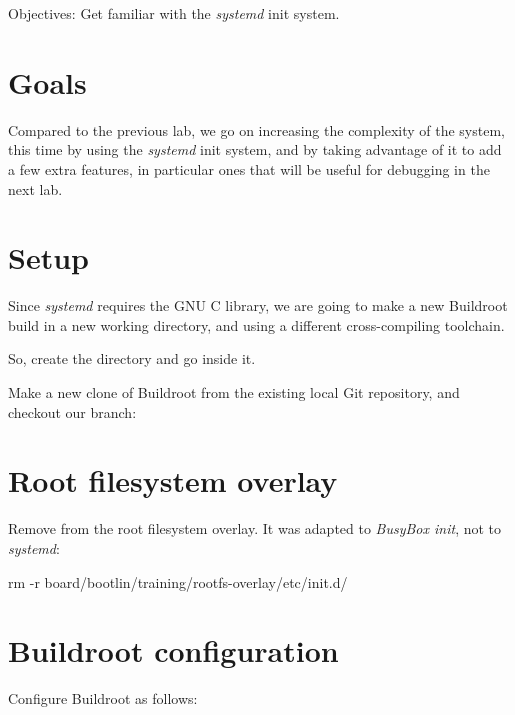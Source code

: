   {Objectives: Get familiar with the {\em systemd} init system.}

\section{Goals}

Compared to the previous lab, we go on increasing the complexity
of the system, this time by using the {\em systemd} init system,
and by taking advantage of it to add a few extra features, in particular
ones that will be useful for debugging in the next lab.

\section{Setup}

Since {\em systemd} requires the GNU C library, we are going
to make a new Buildroot build in a new working directory, and
using a different cross-compiling toolchain.

So, create the  directory
and go inside it.

Make a new clone of Buildroot from the existing local Git repository,
and checkout our  branch:


\section{Root filesystem overlay}

Remove  from the root filesystem overlay.
It was adapted to {\em BusyBox init}, not to {\em systemd}:

\begin{bashinput}
rm -r board/bootlin/training/rootfs-overlay/etc/init.d/
\end{bashinput}

\section{Buildroot configuration}

Configure Buildroot as follows:

